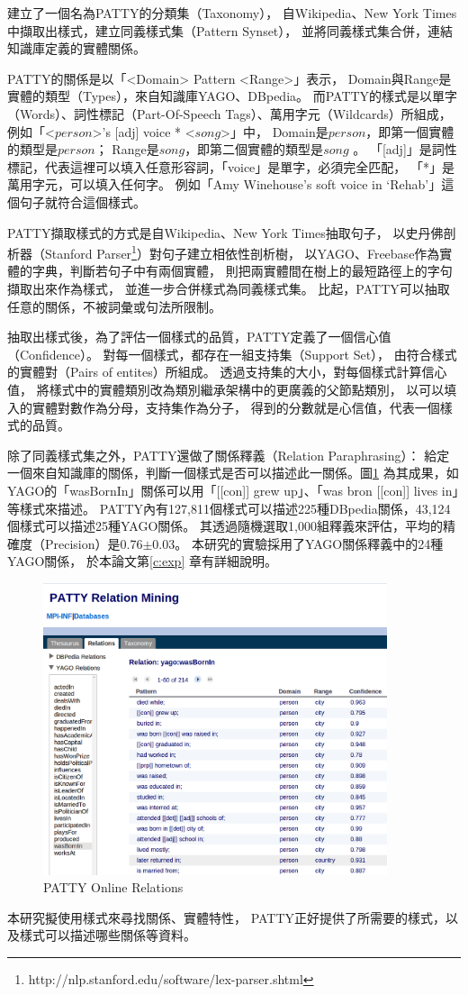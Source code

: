 \cite{patty,patty2012}建立了一個名為PATTY的分類集（Taxonomy），
自Wikipedia、New York Times中擷取出樣式，建立同義樣式集（Pattern Synset），
並將同義樣式集合併，連結知識庫定義的實體關係。

PATTY的關係是以「<Domain> Pattern <Range>」表示，
Domain與Range是實體的類型（Types），來自知識庫YAGO、DBpedia。
而PATTY的樣式是以單字（Words）、詞性標記（Part-Of-Speech Tags）、萬用字元（Wildcards）所組成，
例如「<$person$>'s [adj] voice * <$song$>」中，
Domain是$person$，即第一個實體的類型是$person$；
Range是$song$，即第二個實體的類型是$song$ 。
「[adj]」是詞性標記，代表這裡可以填入任意形容詞，「voice」是單字，必須完全匹配，
「*」是萬用字元，可以填入任何字。
例如「Amy Winehouse's soft voice in `Rehab'」這個句子就符合這個樣式。

PATTY擷取樣式的方式是自Wikipedia、New York Times抽取句子，
以史丹佛剖析器（Stanford Parser\footnote{http://nlp.stanford.edu/software/lex-parser.shtml}）對句子建立相依性剖析樹，
以YAGO、Freebase作為實體的字典，判斷若句子中有兩個實體，
則把兩實體間在樹上的最短路徑上的字句擷取出來作為樣式，
並進一步合併樣式為同義樣式集。
比起\cite{reverb}，PATTY可以抽取任意的關係，不被詞彙或句法所限制。

抽取出樣式後，為了評估一個樣式的品質，PATTY定義了一個信心值（Confidence）。
對每一個樣式，都存在一組支持集（Support Set），
由符合樣式的實體對（Pairs of entites）所組成。
透過支持集的大小，對每個樣式計算信心值，
將樣式中的實體類別改為類別繼承架構中的更廣義的父節點類別，
以可以填入的實體對數作為分母，支持集作為分子，
得到的分數就是心信值，代表一個樣式的品質。

除了同義樣式集之外，PATTY還做了關係釋義（Relation Paraphrasing）：
給定一個來自知識庫的關係，判斷一個樣式是否可以描述此一關係。圖\ref{i:patty-online} 為其成果，如YAGO的「wasBornIn」關係可以用「[[con]] grew up」、「was bron [[con]] lives in」等樣式來描述。
PATTY內有127,811個樣式可以描述225種DBpedia關係，43,124個樣式可以描述25種YAGO關係。
其透過隨機選取1,000組釋義來評估，平均的精確度（Precision）是0.76$\pm$0.03。
本研究的實驗採用了YAGO關係釋義中的24種YAGO關係，
於本論文第\ref{c:exp} 章有詳細說明。

\begin{figure}
    \centering
    \includegraphics[width=0.9\textwidth]{images/02-patty-online}
    \caption{PATTY Online Relations}
    \label{i:patty-online}
\end{figure}

本研究擬使用樣式來尋找關係、實體特性，
PATTY正好提供了所需要的樣式，以及樣式可以描述哪些關係等資料。

